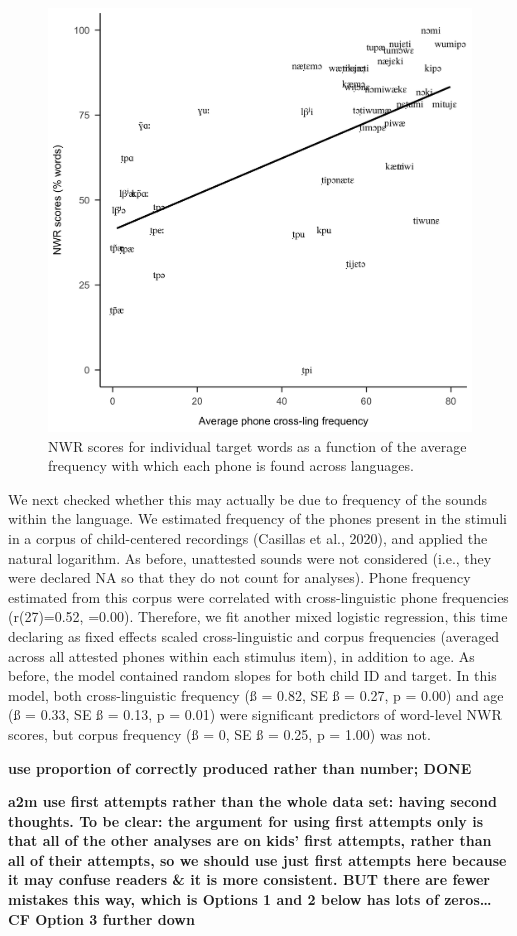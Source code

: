 \documentclass[english,,man,floatsintext]{apa6}
\begin{document}
\begin{figure}[!t]

{\centering \includegraphics[width=0.65\linewidth]{nwr.by.freq.ITEM} 

}

\caption{NWR scores for individual target words as a function of the average frequency with which each phone is found across languages.}\label{fig:Fig2-xling-freq}
\end{figure}

We next checked whether this may actually be due to frequency of the sounds within the language. We estimated frequency of the phones present in the stimuli in a corpus of child-centered recordings (Casillas et al., 2020), and applied the natural logarithm. As before, unattested sounds were not considered (i.e., they were declared NA so that they do not count for analyses). Phone frequency estimated from this corpus were correlated with cross-linguistic phone frequencies (r(27)=0.52, =0.00). Therefore, we fit another mixed logistic regression, this time declaring as fixed effects scaled cross-linguistic and corpus frequencies (averaged across all attested phones within each stimulus item), in addition to age. As before, the model contained random slopes for both child ID and target. In this model, both cross-linguistic frequency (ß = 0.82, SE ß = 0.27, p = 0.00) and age (ß = 0.33, SE ß = 0.13, p = 0.01) were significant predictors of word-level NWR scores, but corpus frequency (ß = 0, SE ß = 0.25, p = 1.00) was not.

\textbf{use proportion of correctly produced rather than number; DONE}

\textbf{a2m use first attempts rather than the whole data set: having second thoughts. To be clear: the argument for using first attempts only is that all of the other analyses are on kids' first attempts, rather than all of their attempts, so we should use just first attempts here because it may confuse readers \& it is more consistent. BUT there are fewer mistakes this way, which is Options 1 and 2 below has lots of zeros\ldots{} CF Option 3 further down}
\end{document}
